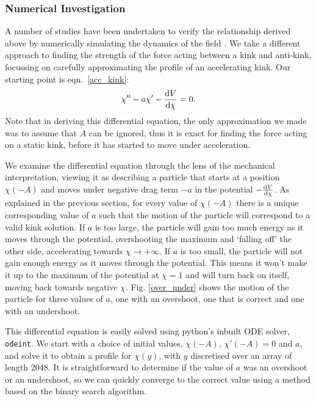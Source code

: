 \documentclass[11pt, oneside]{article}  	%
\numberwithin{equation}{section}
\newcommand{\drv}{\ensuremath{\textup{d}}}
\begin{document}
\subsubsection{Numerical Investigation}
A number of studies have been undertaken to verify the relationship derived above by numerically simulating the dynamics of the field \cite{christov_long-range_2019,belendryasova_scattering_2019,christov_kink-kink_2019}.  We take a different approach to finding the strength of the force acting between a kink and anti-kink, focussing on carefully approximating the profile of an accelerating kink. Our starting point is eqn.~\ref{acc_kink}:
\begin{equation}
\chi'' - a\chi' - \frac{\drv V }{\drv \chi}=0.
\end{equation}
Note that in deriving this differential equation, the only approximation we made was to assume that $\dot{A}$ can be ignored, thus it is exact for finding the force acting on a static kink, before it has started to move under acceleration.\par
We examine the differential equation through the lens of the mechanical interpretation, viewing it as describing a particle that starts at a position $\chi(-A)$ and moves under negative drag term $-a$ in the potential $- \frac{\drv V }{\drv \chi}$. As explained in the previous section, for every value of $\chi(-A)$ there is a unique corresponding value of $a$ such that the motion of the particle will correspond to a valid kink solution. If $a$ is too large, the particle will gain too much energy as it moves through the potential, overshooting the maximum and `falling off' the other side, accelerating towards $\chi \rightarrow +\infty$. If $a$ is too small, the particle will not gain enough energy as it moves through the potential. This means it won't make it up to the maximum of the potential at  $\chi=1$ and will turn back on itself, moving back towards negative $\chi$. Fig. \ref{over_under} shows the motion of the particle for three values of $a$, one with an overshoot, one that is correct and one with an undershoot.\par
This differential equation is easily solved using python's inbuilt ODE solver, \texttt{odeint}. We start with a choice of initial values, $\chi(-A)$, $\chi'(-A) = 0$ and $a$, and solve it to obtain a profile for $\chi(y)$, with $y$ discretised over an array of length 2048. It is straightforward to determine if the value of $a$ was an overshoot or an undershoot, so we can quickly converge to the correct value using a method based on the binary search algorithm. \par
\end{document}
